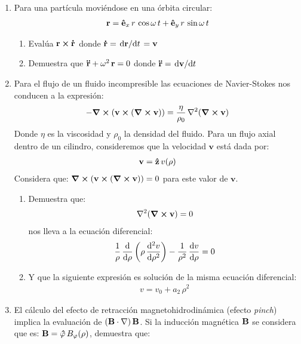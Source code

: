 \begin{enumerate}
\item Para una partícula moviéndose en una órbita circular:
\begin{align*}
\vb{r} = \vu{e}_{x} \, r \, \cos \omega \, t + \vu{e}_{y} \, r \, \sin \omega \, t
\end{align*}
\begin{enumerate}
\item Evalúa $\vb{r} \cp \vb{\dot{r}}$ donde $\vb{\dot{r}} = \dv*{\vb{r}}{t} = \vb{v}$
\item Demuestra que $\vb{\ddot{r}} + \omega^{2} \, \vb{r} = 0$ donde $\vb{\ddot{r}} = \dv*{\vb{v}}{t}$
\end{enumerate}
\item Para el flujo de un fluido incompresible las ecuaciones de Navier-Stokes nos conducen a la expresión:
\begin{align*}
- \curl{( \mathbf{v} \cp (\curl{\vb{v}}))} =  \dfrac{\eta}{\rho_{0}} \, \laplacian{(\curl{\vb{v}})}
\end{align*}
Donde $\eta$ es la viscosidad y $\rho_{0}$ la densidad del fluido. Para un flujo axial dentro de un cilindro, consideremos que la velocidad $\mathbf{v}$ está dada por:
\begin{align*}
\mathbf{v} =  \vu{z} \, v (\rho)
\end{align*}
Considera que: $\curl{( \mathbf{v} \cp (\curl{\vb{v}}))} = 0$ 
para este valor de $\mathbf{v}$.
\begin{enumerate}
\item Demuestra que:
\begin{align*}
    \laplacian{( \curl{\vb{v}} )} = 0
\end{align*}
nos lleva a la ecuación diferencial:
\begin{align*}
    \dfrac{1}{\rho} \, \dv{\rho} \left( \rho \, \dv[2]{v}{\rho} \right) -  \dfrac{1}{\rho^{2}} \, \dv{v}{\rho} = 0
\end{align*}
\item Y que la siguiente expresión es solución de la misma ecuación diferencial:
\begin{align*}
    v = v_{0} + a_{2} \, \rho^{2}
\end{align*}
\end{enumerate}
\item El cálculo del efecto de retracción magnetohidrodinámica (efecto \emph{pinch}) implica la evaluación de $(\vb{B \cdot \nabla}) \, \vb{B}$. Si la inducción magnética $\vb{B}$ se considera que es: $\vb{B} = \vu{\varphi} \, B_{\varphi}(\rho)$, demuestra que:

\end{enumerate}
